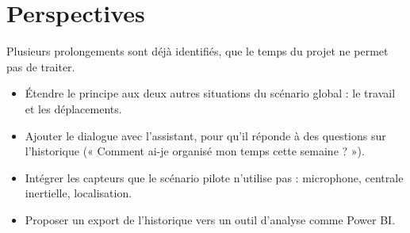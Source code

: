 \chapter*{\textcolor{mycolor}{Perspectives}}

Plusieurs prolongements sont déjà identifiés, que le temps du projet ne permet pas de traiter.

\begin{itemize}
  \item Étendre le principe aux deux autres situations du scénario global : le travail et les déplacements.
  \item Ajouter le dialogue avec l'assistant, pour qu'il réponde à des questions sur l'historique (« Comment ai-je organisé mon temps cette semaine ? »).
  \item Intégrer les capteurs que le scénario pilote n'utilise pas : microphone, centrale inertielle, localisation.
  \item Proposer un export de l'historique vers un outil d'analyse comme Power BI.
\end{itemize}

